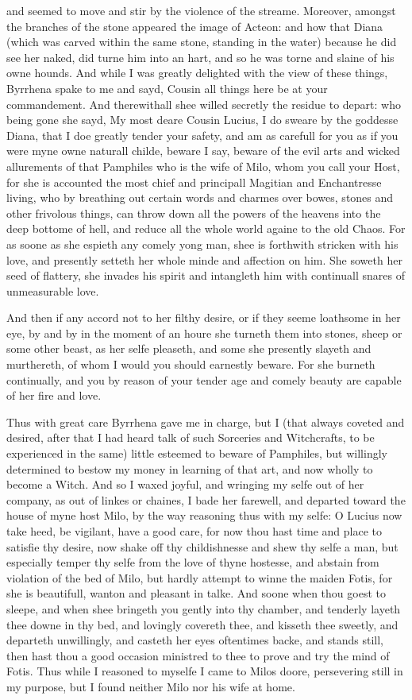 and seemed to move and stir by the violence of the streame. Moreover, amongst
the branches of the stone appeared the image of Acteon: and how that Diana
(which was carved within the same stone, standing in the water) because he did
see her naked, did turne him into an hart, and so he was torne and slaine of
his owne hounds. And while I was greatly delighted with the view of these
things, Byrrhena spake to me and sayd, Cousin all things here be at your
commandement. And therewithall shee willed secretly the residue to depart: who
being gone she sayd, My most deare Cousin Lucius, I do sweare by the goddesse
Diana, that I doe greatly tender your safety, and am as carefull for you as if
you were myne owne naturall childe, beware I say, beware of the evil arts and
wicked allurements of that Pamphiles who is the wife of Milo, whom you call
your Host, for she is accounted the most chief and principall Magitian and
Enchantresse living, who by breathing out certain words and charmes over bowes,
stones and other frivolous things, can throw down all the powers of the heavens
into the deep bottome of hell, and reduce all the whole world againe to the old
Chaos. For as soone as she espieth any comely yong man, shee is forthwith
stricken with his love, and presently setteth her whole minde and affection on
him. She soweth her seed of flattery, she invades his spirit and intangleth him
with continuall snares of unmeasurable love.

And then if any accord not to her filthy desire, or if they seeme loathsome in
her eye, by and by in the moment of an houre she turneth them into stones,
sheep or some other beast, as her selfe pleaseth, and some she presently
slayeth and murthereth, of whom I would you should earnestly beware. For she
burneth continually, and you by reason of your tender age and comely beauty are
capable of her fire and love.

Thus with great care Byrrhena gave me in charge, but I (that always coveted and
desired, after that I had heard talk of such Sorceries and Witchcrafts, to be
experienced in the same) little esteemed to beware of Pamphiles, but willingly
determined to bestow my money in learning of that art, and now wholly to become
a Witch. And so I waxed joyful, and wringing my selfe out of her company, as
out of linkes or chaines, I bade her farewell, and departed toward the house of
myne host Milo, by the way reasoning thus with my selfe: O Lucius now take
heed, be vigilant, have a good care, for now thou hast time and place to
satisfie thy desire, now shake off thy childishnesse and shew thy selfe a man,
but especially temper thy selfe from the love of thyne hostesse, and abstain
from violation of the bed of Milo, but hardly attempt to winne the maiden
Fotis, for she is beautifull, wanton and pleasant in talke. And soone when thou
goest to sleepe, and when shee bringeth you gently into thy chamber, and
tenderly layeth thee downe in thy bed, and lovingly covereth thee, and kisseth
thee sweetly, and departeth unwillingly, and casteth her eyes oftentimes backe,
and stands still, then hast thou a good occasion ministred to thee to prove and
try the mind of Fotis. Thus while I reasoned to myselfe I came to Milos doore,
persevering still in my purpose, but I found neither Milo nor his wife at home.

